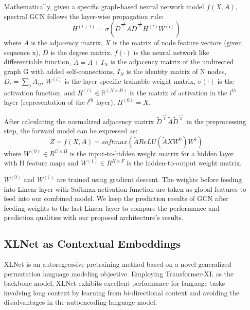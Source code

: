 \documentclass[runningheads]{llncs}
\begin{document}
Mathematically, given a specific graph-based neural network model $f(X, A)$, spectral GCN follows the layer-wise propagation rule:
\begin{equation}
\label{gcn_h}
H^{(l+1)} = \sigma(\tilde{D}^{\frac{-1}{2}}\tilde{A}\tilde{D}^{\frac{-1}{2}}H^{(l)}W^{(l)})
\end{equation}
where $A$ is the adjacency matrix, $X$ is the matrix of node feature vectors (given sequence x), $D$ is the degree matrix, $f(\cdot)$ is the neural network like differentiable function, $\tilde{A} = A + I_{N}$ is the adjacency matrix of the undirected graph G with added self-connections,  $I_{N}$ is the identity matrix of N nodes, $\tilde{D}_{i} = \sum_j \tilde{A}_{ij}$, $W^{(l)}$ is the layer-specific trainable weight matrix, $\sigma(\cdot)$ is the activation function, and $H^{(l)} \in \mathbb{R}^{(N \times D)}$ is the matrix of activation in the $l^{th}$ layer (representation of the $l^{th}$ layer), $H^{(0)} = X$.

After calculating the normalized adjacency matrix $\tilde{D}^{\frac{-1}{2}}\tilde{A}\tilde{D}^{\frac{-1}{2}}$ in the preprocessing step, the forward model can be expressed as:
\begin{equation}
    Z = f(X,A) = softmax(\tilde{A}ReLU(\tilde{A}XW^{0})W^{1})
\end{equation}
where $W^{(0)} \in R^{C \times H}$ is the input-to-hidden weight matrix for a hidden layer with H feature maps and $W^{(1)} \in R^{H \times F}$ is the hidden-to-output weight matrix.


$W^{(0)}$ and $W^{(1)}$ are trained using gradient descent. The weights before feeding into Linear layer with Softmax activation function are taken as global features to feed into our combined model. We keep the prediction results of GCN after feeding weights to the last Linear layer to compare the performance and prediction qualities with our proposed architecture's results.



\subsection{XLNet as Contextual Embeddings}
XLNet is an autoregressive pretraining method based on a novel generalized permutation language modeling objective. Employing Transformer-XL as the backbone model, XLNet exhibits excellent performance for language tasks involving long context by learning from bi-directional context and avoiding the disadvantages in the autoencoding language model.
\end{document}
